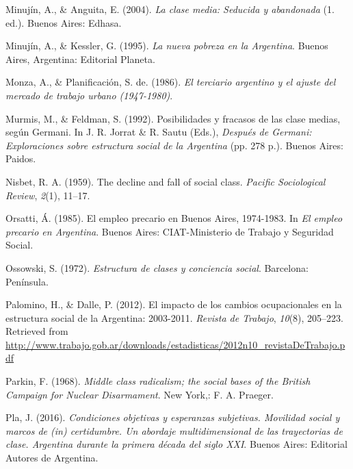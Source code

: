 \documentclass[
]{article}
\newlength{\cslhangindent}
\newlength{\cslentryspacingunit} %
\newenvironment{CSLReferences}[2] %
 {%
  \setlength{\parindent}{0pt}
  \ifodd #1
  \let\oldpar\par
  \def\par{\hangindent=\cslhangindent\oldpar}
  \fi
  \setlength{\parskip}{#2\cslentryspacingunit}
 }%
 {}
\begin{document}
\begin{CSLReferences}{1}{0}
\leavevmode{}%
Minujín, A., \& Anguita, E. (2004). \emph{La clase media: Seducida y abandonada} (1. ed.). Buenos Aires: Edhasa.

\leavevmode{}%
Minujín, A., \& Kessler, G. (1995). \emph{La nueva pobreza en la {Argentina}}. Buenos Aires, Argentina: Editorial Planeta.

\leavevmode{}%
Monza, A., \& Planificación, S. de. (1986). \emph{El terciario argentino y el ajuste del mercado de trabajo urbano (1947-1980)}.

\leavevmode{}%
Murmis, M., \& Feldman, S. (1992). Posibilidades y fracasos de las clase medias, según {Germani}. In J. R. Jorrat \& R. Sautu (Eds.), \emph{Después de {Germani}: {Exploraciones} sobre estructura social de la {Argentina}} (pp. 278 p.). Buenos Aires: Paidos.

\leavevmode{}%
Nisbet, R. A. (1959). The decline and fall of social class. \emph{Pacific Sociological Review}, \emph{2}(1), 11--17.

\leavevmode{}%
Orsatti, Á. (1985). El empleo precario en {Buenos} {Aires}, 1974-1983. In \emph{El empleo precario en {Argentina}}. Buenos Aires: CIAT-Ministerio de Trabajo y Seguridad Social.

\leavevmode{}%
Ossowski, S. (1972). \emph{Estructura de clases y conciencia social}. Barcelona: Península.

\leavevmode{}%
Palomino, H., \& Dalle, P. (2012). El impacto de los cambios ocupacionales en la estructura social de la {Argentina}: 2003-2011. \emph{Revista de Trabajo}, \emph{10}(8), 205--223. Retrieved from \url{http://www.trabajo.gob.ar/downloads/estadisticas/2012n10_revistaDeTrabajo.pdf}

\leavevmode{}%
Parkin, F. (1968). \emph{Middle class radicalism; the social bases of the {British} {Campaign} for {Nuclear} {Disarmament}}. New York,: F. A. Praeger.

\leavevmode{}%
Pla, J. (2016). \emph{Condiciones objetivas y esperanzas subjetivas. {Movilidad} social y marcos de (in) certidumbre. {Un} abordaje multidimensional de las trayectorias de clase. {Argentina} durante la primera década del siglo {XXI}}. Buenos Aires: Editorial Autores de Argentina.


\end{CSLReferences}
\end{document}
